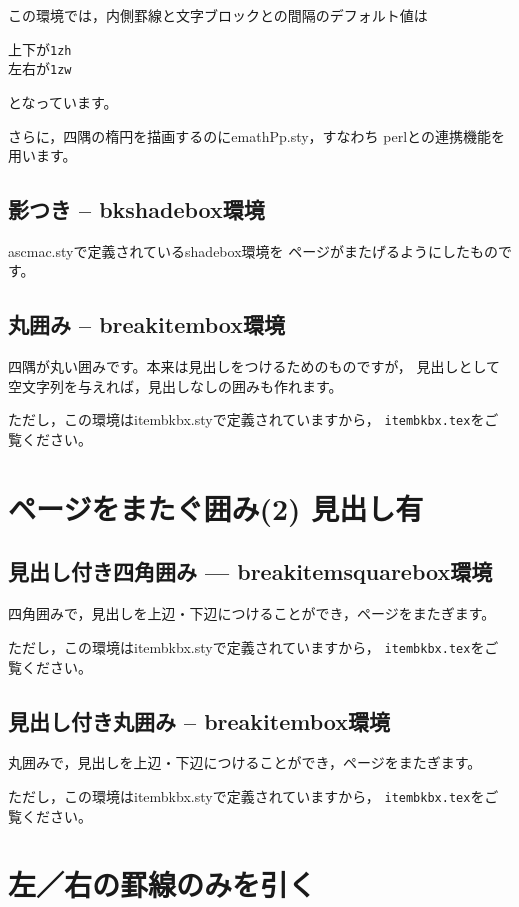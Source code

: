 \documentclass[a4j,fleqn]{jarticle}
\begin{document}
この環境では，内側罫線と文字ブロックとの間隔のデフォルト値は
\begin{jquote}
上下が\texttt{1zh}\\
左右が\texttt{1zw}
\end{jquote}
となっています。

さらに，四隅の楕円を描画するのに\textsf{emathPp.sty}，すなわち
\textsf{perl}との連携機能を用います。

\subsection{影つき -- bkshadebox環境}
\textsf{ascmac.sty}で定義されている\textsf{shadebox}環境を
ページがまたげるようにしたものです。



\subsection{丸囲み -- breakitembox環境}
四隅が丸い囲みです。本来は見出しをつけるためのものですが，
見出しとして空文字列を与えれば，見出しなしの囲みも作れます。

ただし，この環境は\textsf{itembkbx.sty}で定義されていますから，
\texttt{itembkbx.tex}をご覧ください。

\section{ページをまたぐ囲み(2) 見出し有}
\subsection{見出し付き四角囲み --- \textsf{breakitemsquarebox}環境}
四角囲みで，見出しを上辺・下辺につけることができ，ページをまたぎます。

ただし，この環境は\textsf{itembkbx.sty}で定義されていますから，
\texttt{itembkbx.tex}をご覧ください。

\subsection{見出し付き丸囲み -- breakitembox環境}
丸囲みで，見出しを上辺・下辺につけることができ，ページをまたぎます。

ただし，この環境は\textsf{itembkbx.sty}で定義されていますから，
\texttt{itembkbx.tex}をご覧ください。

\section{左／右の罫線のみを引く}
\end{document}
